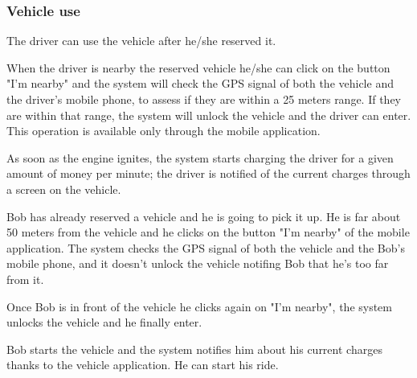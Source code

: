 \subsubsection{Vehicle use}

The driver can use the vehicle after he/she reserved it.

When the driver is nearby the reserved vehicle he/she can click on the button "I'm nearby" and the system will check the GPS signal of both the vehicle and the driver's mobile phone, to assess if they are within a 25 meters range. If they are within that range, the system will unlock the vehicle and the driver can enter. This operation is available only through the mobile application.

As soon as the engine ignites, the system starts charging the driver for a given amount of money per minute; the driver is notified of the current charges through a screen on the vehicle.

Bob has already reserved a vehicle and he is going to pick it up. He is far about 50 meters from the vehicle and he clicks on the button "I'm nearby" of the mobile application. The system checks the GPS signal of both the vehicle and the Bob's mobile phone, and it doesn't unlock the vehicle notifing Bob that he's too far from it.

Once Bob is in front of the vehicle he clicks again on "I'm nearby", the system unlocks the vehicle and he finally enter.

Bob starts the vehicle and the system notifies him about his current charges thanks to the vehicle application. He can start his ride.

